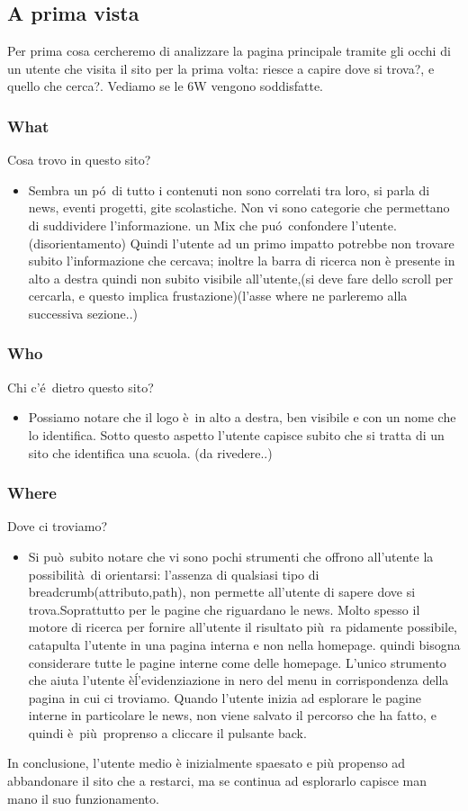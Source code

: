 \documentclass[12pt]{article}
\begin{document}
\subsection{A prima vista}
Per prima cosa cercheremo di analizzare la pagina principale tramite gli occhi di un utente che visita il sito per la prima volta: riesce a capire dove si trova?, e quello che cerca?. Vediamo se le 6W vengono soddisfatte.


\subsubsection{What} Cosa trovo in questo sito?
\begin{itemize}
	\item Sembra un p\'o\ di tutto i contenuti non sono correlati tra loro, si parla di news, eventi progetti, gite scolastiche. Non vi sono categorie che permettano di suddividere l'informazione. un Mix che pu\'o\ confondere l'utente.(disorientamento) Quindi l'utente ad un primo impatto potrebbe non trovare subito l'informazione che cercava; inoltre la barra di ricerca non è presente in alto a destra quindi non subito visibile all'utente,(si deve fare dello scroll per cercarla, e questo implica frustazione)(l'asse where ne parleremo alla successiva sezione..)
\end{itemize}
\subsubsection{Who} Chi c'\'e\ dietro questo sito?
\begin{itemize}
	\item Possiamo notare che il logo \`e\ in alto a destra, ben visibile e con un nome che lo identifica. Sotto questo aspetto l'utente capisce subito che si tratta di  un sito che identifica una scuola. (da rivedere..)
\end{itemize}
\subsubsection{Where} Dove ci troviamo?
\begin{itemize}
	\item Si pu\`o\ subito notare che vi sono pochi strumenti che offrono all'utente la possibilit\`a\ di orientarsi:
	l'assenza di qualsiasi tipo di breadcrumb(attributo,path), non permette all'utente
	di sapere dove si trova.Soprattutto per le pagine che riguardano le news. Molto spesso il motore di ricerca per fornire all'utente il risultato pi\`u\ ra pidamente possibile, catapulta l'utente in una pagina interna e non nella homepage. quindi bisogna considerare tutte le pagine interne come delle homepage.
	L'unico strumento che aiuta l'utente \`e\'  l'evidenziazione in nero del menu in corrispondenza della pagina in cui ci troviamo.
	Quando l'utente inizia ad esplorare le pagine interne in particolare le news, non viene salvato il percorso che ha fatto, e quindi \`e\ pi\`u\ proprenso a cliccare il pulsante back.
\end{itemize}
In conclusione, l'utente medio \`e inizialmente spaesato e pi\`u propenso ad abbandonare il sito che a restarci, ma se continua ad esplorarlo capisce man mano il suo funzionamento.
\end{document}

